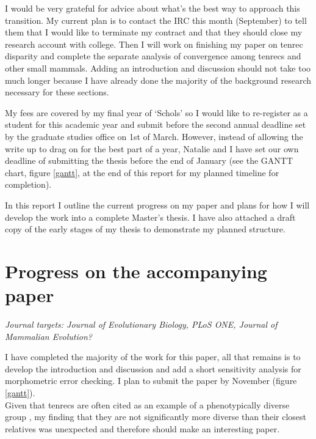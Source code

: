 \documentclass[12pt,a4paper]{article}
\begin{document}
	I would be very grateful for advice about what's the best way to approach this transition. My current plan is to contact the IRC this month (September) to tell them that I would like to terminate my contract and that they should close my research account with college.  Then I will work on finishing my paper on tenrec disparity and complete the separate analysis of convergence among tenrecs and other small mammals. Adding an introduction and discussion should not take too much longer because I have already done the majority of the background research necessary for these sections.

	My fees are covered by my final year of `Schols' so I would like to re-register as a student for this academic year and submit before the second annual deadline set by the graduate studies office on 1st of March. However, instead of allowing the write up to drag on for the best part of a year, Natalie and I have set our own deadline of submitting the thesis before the end of January (see the GANTT chart, figure \ref*{gantt}, at the end of this report for my planned timeline for completion).
 
	In this report I outline the current progress on my paper and plans for how I will develop the work into a complete Master's thesis. I have also attached a draft copy of the early stages of my thesis to demonstrate my planned structure.   


\section{Progress on the accompanying paper}

	\textit{Journal targets: Journal of Evolutionary Biology, PLoS ONE, Journal of Mammalian Evolution?} 
\bigskip

	I have completed the majority of the work for this paper, all that remains is to develop the introduction and discussion and add a short sensitivity analysis for morphometric error checking. I plan to submit the paper by November (figure \ref{gantt}). \\
	Given that tenrecs are often cited as an example of a phenotypically diverse group \citep[e.g.][]{Olson2013}, my finding that they are not significantly more diverse than their closest relatives was unexpected and therefore should make an interesting paper.
\end{document}

